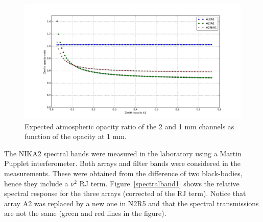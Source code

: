\begin{figure}[ht] %
\begin{center}
\includegraphics[width=\textwidth]{Figures/SpectralBands/opacity_ratio_vs_tau1.pdf}
\caption{Expected atmospheric opacity ratio of the 2 and 1 mm channels as function of the opacity at 1 mm. \label{thopacities}}
\end{center}
\end{figure}



The NIKA2 spectral bands were measured in the laboratory using a Martin Pupplet interferometer.
Both arrays and filter bands were considered in the
measurements. These were obtained from the difference of two
black-bodies, hence they include a $\nu^2$ RJ term.
Figure~\ref{spectralband1} shows the
relative spectral response for the three arrays (corrected of the RJ
term). Notice that array A2 was replaced by a new one in N2R5 and that
the spectral transmissions are not the same (green and red lines in the
figure). 



